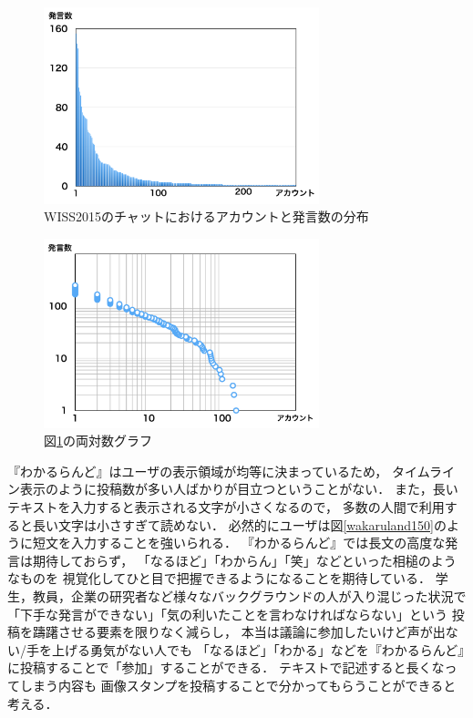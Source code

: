 \begin{figure}[h]
\centering\includegraphics[width=8cm]{images/wisschat.png}
\caption{WISS2015のチャットにおけるアカウントと発言数の分布}
\label{wisschat}
\end{figure}

\begin{figure}[h]
\centering\includegraphics[width=8cm]{images/powerlaw.png}
\caption{図\ref{wisschat}の両対数グラフ}
\label{powerlaw}
\end{figure}

『わかるらんど』はユーザの表示領域が均等に決まっているため，
タイムライン表示のように投稿数が多い人ばかりが目立つということがない．
また，長いテキストを入力すると表示される文字が小さくなるので，
多数の人間で利用すると長い文字は小さすぎて読めない．
必然的にユーザは図\ref{wakaruland150}のように短文を入力することを強いられる．
『わかるらんど』では長文の高度な発言は期待しておらず，
「なるほど」「わからん」「笑」などといった相槌のようなものを
視覚化してひと目で把握できるようになることを期待している．
学生，教員，企業の研究者など様々なバックグラウンドの人が入り混じった状況で
「下手な発言ができない」「気の利いたことを言わなければならない」という
投稿を躊躇させる要素を限りなく減らし，
本当は議論に参加したいけど声が出ない/手を上げる勇気がない人でも
「なるほど」「わかる」などを『わかるらんど』に投稿することで「参加」することができる．
テキストで記述すると長くなってしまう内容も
画像スタンプを投稿することで分かってもらうことができると考える．


